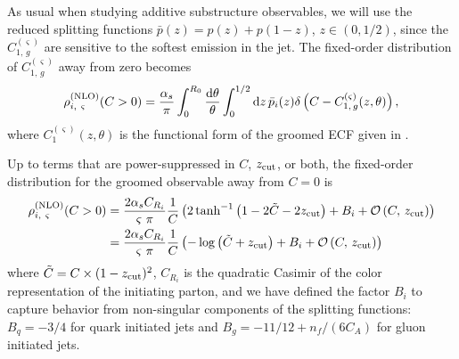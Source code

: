 \begin{example}
    \label{ex:constant-subtraction-gecf}
    As usual when studying additive substructure observables, we will use the reduced splitting functions \(\bar{p}(z) = p(z) + p(1-z)\), \(z \in (0,1/2)\), since the \(C_{1,\,g}^{(\varsigma)}\) are sensitive to the softest emission in the jet.
   The fixed-order distribution of \(C_{1,\,g}^{(\varsigma)}\) away from zero becomes
%
\begin{align}
    \rho^{\rm(NLO)}_{i,~\varsigma}(C>0)
    =
    \frac{\alpha_s}{\pi}\int_0^{R_0}\frac{\dd\theta}{\theta}
    \int_0^{1/2} \dd z\, \Bar{p}_i(z)
    \delta\left(C - C_{1,\,g}^{(\varsigma)}(z,\theta)\right),
    \label{eq:NLO_dist_setup}
\end{align}
%
where  \(C_1^{(\varsigma)}(z,\theta)\) is the functional form of the groomed ECF given in .

Up to terms that are power-suppressed in \(C\), \(z_{\rm cut}\), or both, the fixed-order distribution for the groomed observable away from \(C = 0\) is
%
\begin{subequations}
\label{eq:piranha_nlo}
\begin{align}
    \rho^{\rm(NLO)}_{i,~\varsigma}(C>0)
    &=
    \frac{2\alpha_s C_{R_i}}{\varsigma~\pi}
    \frac{1}{C}
    \left(
        2\tanh^{-1}\left(1  -2 \tilde C - 2z_{\rm cut}\right)
        + B_i
        +
        \mathcal{O}\left(C,\,z_{\rm cut}\right)
    \right)
    \\
    &=
    \frac{2\alpha_s C_{R_i}}{\varsigma~\pi}
    \frac{1}{C}
    \left(
        -\log\left(\tilde C + z_{\rm cut}\right)
        + B_i
        +
        \mathcal{O}\left(C,\,z_{\rm cut}\right)
    \right)
\end{align}
\end{subequations}
%
where \(\tilde C = C \times (1-z_{\rm cut})^2\), \(C_{R_i}\) is the quadratic Casimir of the color representation of the initiating parton, and we have defined the factor \(B_i\) to capture behavior from non-singular components of the splitting functions:
%
\(B_q = -3/4\) for quark initiated jets and \(B_g = -11/12 + n_f/(6 C_A)\) for gluon initiated jets.
\end{example}

